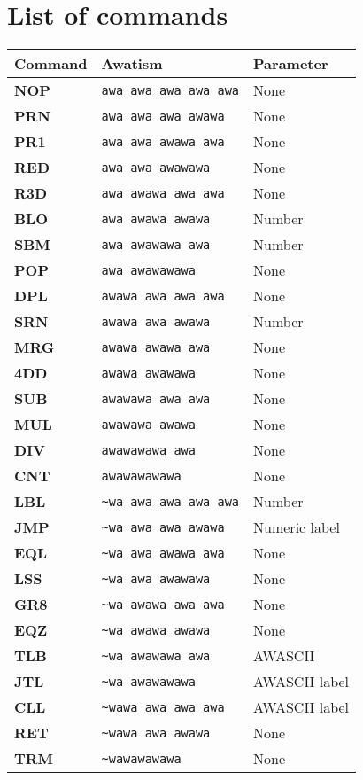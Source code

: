 \documentclass[11pt,a4paper,draft]{book}
\begin{document}
\section{List of commands}
\label{list-of-opcodes}
\begin{longtable}{lll}
  \toprule
  Command & Awatism & Parameter \\
  \midrule \endhead

  \bottomrule \endfoot

  \textbf{NOP} & \verb|awa awa awa awa awa| & None \\
  \textbf{PRN} & \verb|awa awa awa awawa| & None \\
  \textbf{PR1} & \verb|awa awa awawa awa| & None \\
  \textbf{RED} & \verb|awa awa awawawa| & None \\
  \textbf{R3D} & \verb|awa awawa awa awa| & None \\
  \textbf{BLO} & \verb|awa awawa awawa| & Number \\
  \textbf{SBM} & \verb|awa awawawa awa| & Number \\
  \textbf{POP} & \verb|awa awawawawa| & None \\
  \textbf{DPL} & \verb|awawa awa awa awa| & None \\
  \textbf{SRN} & \verb|awawa awa awawa| & Number \\
  \textbf{MRG} & \verb|awawa awawa awa| & None \\
  \textbf{4DD} & \verb|awawa awawawa| & None \\
  \textbf{SUB} & \verb|awawawa awa awa| & None \\
  \textbf{MUL} & \verb|awawawa awawa| & None \\
  \textbf{DIV} & \verb|awawawawa awa| & None \\
  \textbf{CNT} & \verb|awawawawawa| & None \\
  \textbf{LBL} & \verb|~wa awa awa awa awa| & Number \\
  \textbf{JMP} & \verb|~wa awa awa awawa| & Numeric label \\
  \textbf{EQL} & \verb|~wa awa awawa awa| & None \\
  \textbf{LSS} & \verb|~wa awa awawawa| & None \\
  \textbf{GR8} & \verb|~wa awawa awa awa| & None \\
  \textbf{EQZ} & \verb|~wa awawa awawa| & None \\
  \textbf{TLB} & \verb|~wa awawawa awa| & AWASCII \\
  \textbf{JTL} & \verb|~wa awawawawa| & AWASCII label \\
  \textbf{CLL} & \verb|~wawa awa awa awa| & AWASCII label \\
  \textbf{RET} & \verb|~wawa awa awawa| & None \\
  \textbf{TRM} & \verb|~wawawawawa| & None \\
\end{longtable}
\end{document}
